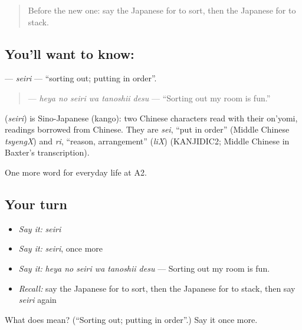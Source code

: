 \label{lesson:JA-C159-seiri}



\begin{quote}
Before the new one: say the Japanese for to sort, then the Japanese for to stack.
\end{quote}

\subsection*{You'll want to know: }
\textbf{} — \emph{seiri} — \textquotedblleft{}sorting out; putting in order\textquotedblright{}.

\begin{quote}
\textbf{  } — \emph{heya no seiri wa tanoshii desu} — \textquotedblleft{}Sorting out my room is fun.\textquotedblright{}
\end{quote}

\begin{cousinweb}
\textbf{} (\emph{seiri}) is Sino-Japanese (kango): two Chinese characters read with their on'yomi, readings borrowed from Chinese. They are \emph{sei}, \textquotedblleft{}put in order\textquotedblright{} (Middle Chinese \emph{tsyengX}) and \emph{ri}, \textquotedblleft{}reason, arrangement\textquotedblright{} (\emph{liX}) (KANJIDIC2; Middle Chinese in Baxter's transcription).
\end{cousinweb}

\begin{grammarlens}[title={What you've built}]
One more word for everyday life at A2.
\end{grammarlens}

\subsection*{Your turn}
\begin{itemize}
\raggedright
  \item \emph{Say it:} \emph{seiri}
  \item \emph{Say it:} \emph{seiri}, once more
  \item \emph{Say it:} \emph{heya no seiri wa tanoshii desu} — Sorting out my room is fun.
  \item \emph{Recall:} say the Japanese for to sort, then the Japanese for to stack, then say \emph{seiri} again
\end{itemize}

\begin{tcolorbox}[breakable,colback=teal!4,colframe=teal!35!black,title={Before you move on}]
What does  mean? (\textquotedblleft{}Sorting out; putting in order\textquotedblright{}.) Say it once more.
\end{tcolorbox}
